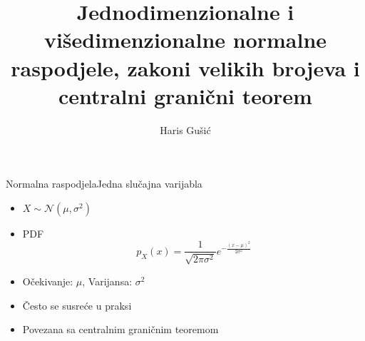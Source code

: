 \documentclass[aspectratio=169]{beamer}
\title {
  Jednodimenzionalne i višedimenzionalne normalne raspodjele, zakoni velikih
  brojeva i centralni granični teorem
}
\author{Haris Gušić}
\begin{document}
  \begin{frame}
    \maketitle
  \end{frame}

{

	 {
	}

  \begin{frame}{Normalna raspodjela}{Jedna slučajna varijabla}
    \begin{itemize}
      \item $X \sim \mathcal{N}(\mu,\sigma^2)$
      \item PDF
        $$p_X(x) = \frac{1}{\sqrt{2\pi\sigma^2}} e^{-\frac{(x-\mu)^2}{2\sigma^2}}$$
      \item Očekivanje: $\mu$, Varijansa: $\sigma^2$
      \item Često se susreće u praksi
      \item Povezana sa centralnim graničnim teoremom
    \end{itemize}
  \end{frame}

}
\end{document}
